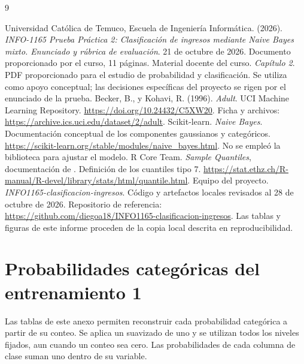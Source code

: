 \documentclass[11pt,a4paper]{article}
\newcommand{\archivo}[1]{\path{#1}}
\begin{document}
\clearpage
\begin{thebibliography}{9}
 Universidad Católica de Temuco, Escuela de Ingeniería Informática. (2026). \emph{INFO-1165 Prueba Práctica 2: Clasificación de ingresos mediante Naive Bayes mixto. Enunciado y rúbrica de evaluación}. 21 de octubre de 2026. Documento proporcionado por el curso, 11 páginas.
 Material docente del curso. \emph{Capítulo 2}. PDF proporcionado para el estudio de probabilidad y clasificación. Se utiliza como apoyo conceptual; las decisiones específicas del proyecto se rigen por el enunciado de la prueba.
 Becker, B., y Kohavi, R. (1996). \emph{Adult}. UCI Machine Learning Repository. \url{https://doi.org/10.24432/C5XW20}. Ficha y archivos: \url{https://archive.ics.uci.edu/dataset/2/adult}.
 Scikit-learn. \emph{Naive Bayes}. Documentación conceptual de los componentes gaussianos y categóricos. \url{https://scikit-learn.org/stable/modules/naive_bayes.html}. No se empleó la biblioteca para ajustar el modelo.
 R Core Team. \emph{Sample Quantiles}, documentación de \archivo{stats::quantile}. Definición de los cuantiles tipo 7. \url{https://stat.ethz.ch/R-manual/R-devel/library/stats/html/quantile.html}.
 Equipo del proyecto. \emph{INFO1165-clasificacion-ingresos}. Código y artefactos locales revisados al 28 de octubre de 2026. Repositorio de referencia: \url{https://github.com/diegoa18/INFO1165-clasificacion-ingresos}. Las tablas y figuras de este informe proceden de la copia local descrita en reproducibilidad.
\end{thebibliography}

\clearpage\appendix
\section{Probabilidades categóricas del entrenamiento 1}
Las tablas de este anexo permiten reconstruir cada probabilidad categórica a partir de su conteo. Se aplica un suavizado de uno y se utilizan todos los niveles fijados, aun cuando un conteo sea cero. Las probabilidades de cada columna de clase suman uno dentro de su variable.
\end{document}
